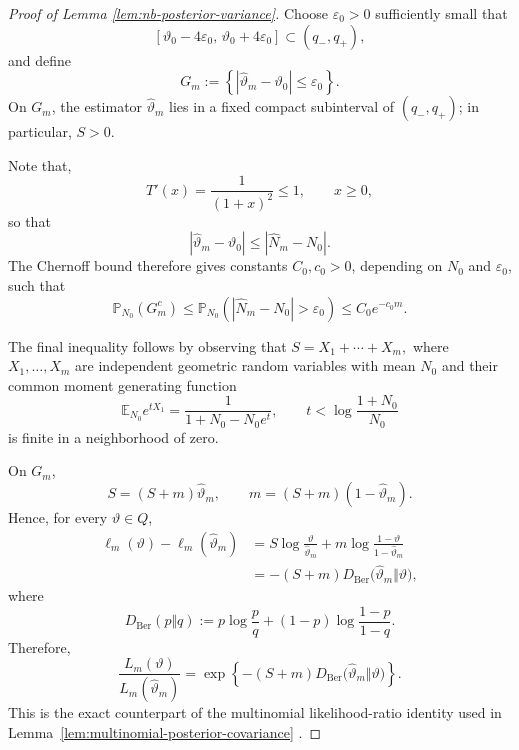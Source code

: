 \documentclass{article}
\theoremstyle{named}
\theoremstyle{named1}
\theoremstyle{plain}
\theoremstyle{remark}
\begin{document}
\begin{proof}[Proof of Lemma \ref{lem:nb-posterior-variance}]
Choose \(\varepsilon_0>0\) sufficiently small that
\[
    [\vartheta_0-4\varepsilon_0,\,
      \vartheta_0+4\varepsilon_0]
    \subset(q_-,q_+),
\]
and define
\begin{equation}
    G_m
    :=
    \left\{
        |\widehat\vartheta_m-\vartheta_0|
        \leq\varepsilon_0
    \right\}.
    \label{eq:nb-proof-good-event}
\end{equation}
On \(G_m\), the estimator \(\widehat\vartheta_m\) lies in a fixed
compact subinterval of \((q_-,q_+)\); in particular, \(S>0\).

Note that,
\[
    T'(x)=\frac{1}{(1+x)^2}\leq1,
    \qquad x\geq0,
\]
so that
\[
    |\widehat\vartheta_m-\vartheta_0|
    \leq
    |\widehat N_m-N_0|.
\]
The Chernoff bound therefore gives constants \(C_0,c_0>0\),
depending on \(N_0\) and \(\varepsilon_0\), such that
\begin{equation}
    \mathbb P_{N_0}(G_m^c)
    \leq
    \mathbb P_{N_0}
    \left(
        |\widehat N_m-N_0|>\varepsilon_0
    \right)
    \leq
    C_0e^{-c_0m}.
    \label{eq:nb-proof-good-event-tail}
\end{equation}

The final inequality follows by observing that
$S=X_1+\cdots+X_m,$
where \(X_1,\ldots,X_m\) are independent geometric random variables
with mean \(N_0\) and their common moment generating function
\[
    \mathbb E_{N_0}e^{tX_1}
    =
    \frac{1}{1+N_0-N_0e^t},
    \qquad
    t<\log\frac{1+N_0}{N_0}
\]
 is finite in a neighborhood of zero. 

On \(G_m\),
\[
    S=(S+m)\widehat\vartheta_m,
    \qquad
    m=(S+m)(1-\widehat\vartheta_m).
\]
Hence, for every \(\vartheta\in Q\),
\begin{align}
    \ell_m(\vartheta)
    -
    \ell_m(\widehat\vartheta_m)
    &=
    S\log\frac{\vartheta}{\widehat\vartheta_m}
    +
    m\log\frac{1-\vartheta}{1-\widehat\vartheta_m}
    \nonumber\\
    &=
    -(S+m)
    D_{\mathrm{Ber}}
    \bigl(\widehat\vartheta_m\Vert\vartheta\bigr),
    \label{eq:nb-proof-kl-identity}
\end{align}
where
\[
    D_{\mathrm{Ber}}(p\Vert q)
    :=
    p\log\frac pq
    +
    (1-p)\log\frac{1-p}{1-q}.
\]
Therefore,
\begin{equation}
    \frac{L_m(\vartheta)}
         {L_m(\widehat\vartheta_m)}
    =
    \exp\left\{
        -(S+m)
        D_{\mathrm{Ber}}
        \bigl(\widehat\vartheta_m\Vert\vartheta\bigr)
    \right\}.
    \label{eq:nb-proof-likelihood-ratio}
\end{equation}
This is the exact counterpart of the multinomial likelihood-ratio
identity used in Lemma~\ref{lem:multinomial-posterior-covariance} .



\end{proof}
\end{document}
